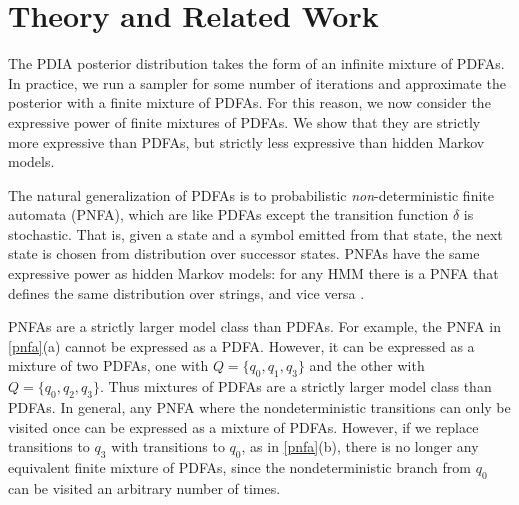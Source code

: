 \section{Theory and Related Work}
\label{sec:theory}

The PDIA posterior distribution takes the form of an infinite mixture of PDFAs.  In practice, we run a sampler for some number of iterations and approximate the posterior with a finite mixture of PDFAs.  For this reason, we now consider the expressive power of finite mixtures of PDFAs.  We show that they are strictly more expressive than PDFAs, but strictly less expressive than hidden Markov models.

The natural generalization of PDFAs is to probabilistic {\em non}-deterministic finite automata (PNFA), which are like PDFAs except the transition function $\delta$ is stochastic.  That is, given a state and a symbol emitted from that state, the next state is chosen from distribution over successor states.    PNFAs have the same expressive power as hidden Markov models: for any HMM there is a PNFA that defines the same distribution over strings, and vice versa \cite{Dupont2005}.

PNFAs are a strictly larger model class than PDFAs.  For example, the PNFA in \ref{pnfa}(a) cannot be expressed as a PDFA.  However, it can be expressed as a mixture of two PDFAs, one with $Q = \{q_0,q_1,q_3\}$ and the other with $Q = \{q_0,q_2,q_3\}$.  Thus mixtures of PDFAs are a strictly larger model class than PDFAs.  In general, any PNFA where the nondeterministic transitions can only be visited once can be expressed as a mixture of PDFAs.  However, if we replace transitions to $q_3$ with transitions to $q_0$, as in \ref{pnfa}(b), there is no longer any equivalent finite mixture of PDFAs, since the nondeterministic branch from $q_0$ can be visited an arbitrary number of times.    


